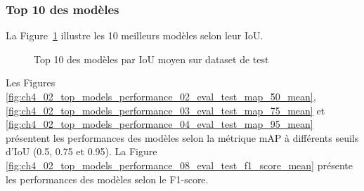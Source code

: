 \subsubsection{Top 10 des modèles}

La Figure~\ref{fig:ch4_02_top_models_performance_01_eval_test_iou_mean} illustre les 10 meilleurs modèles selon leur IoU.

\begin{figure}[H]
    \centering
    \caption{Top 10 des modèles par IoU moyen sur dataset de test}
    \label{fig:ch4_02_top_models_performance_01_eval_test_iou_mean}
\end{figure}

Les Figures \ref{fig:ch4_02_top_models_performance_02_eval_test_map_50_mean}, \ref{fig:ch4_02_top_models_performance_03_eval_test_map_75_mean} et \ref{fig:ch4_02_top_models_performance_04_eval_test_map_95_mean} présentent les performances des modèles selon la métrique mAP à différents seuils d'IoU (0.5, 0.75 et 0.95). La Figure \ref{fig:ch4_02_top_models_performance_08_eval_test_f1_score_mean} présente les performances des modèles selon le F1-score.

